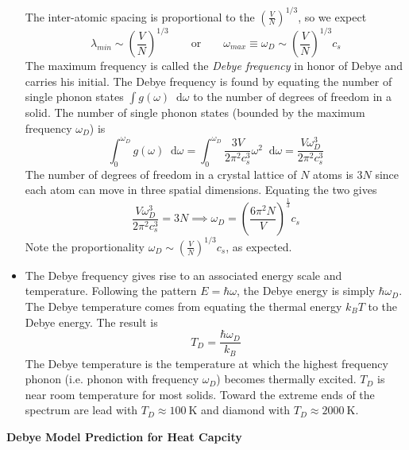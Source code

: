 \documentclass[11pt, a4paper]{article}
\newcommand{\eqtext}[1]{\qquad \text{#1} \qquad}
\newcommand{\diff}{\mathop{}\!\mathrm{d}} %
\begin{document}
\begin{itemize}
	The inter-atomic spacing is proportional to the $ \left(\frac{V}{N}\right)^{1/3} $, so we expect
	\begin{equation*}
		\lambda_{min} \sim \left(\frac{V}{N}\right)^{1/3} \eqtext{or} \omega_{max} \equiv \omega_{D} \sim \left(\frac{V}{N}\right)^{1/3} c_{s}
	\end{equation*}
	The maximum frequency is called the \textit{Debye frequency} in honor of Debye and carries his initial. The Debye frequency is found by equating the number of single phonon states $ \int g(\omega)\diff \omega $ to the number of degrees of freedom in a solid. The number of single phonon states (bounded by the maximum frequency $ \omega_{D} $) is
	\begin{equation*}
		\int_{0}^{\omega_{D}} g(\omega)\diff \omega  = \int_{0}^{\omega_{D}}\frac{3V}{2\pi^{2}c_{s}^{3}} \omega^{2} \diff \omega = \frac{V\omega_{D}^{3}}{2\pi^{2}c_{s}^{3}}
	\end{equation*}
	The number of degrees of freedom in a crystal lattice of $ N $ atoms is $ 3N $ since each atom can move in three spatial dimensions. Equating the two gives
	\begin{equation*}
		\frac{V\omega_{D}^{3}}{2\pi^{2}c_{s}^{3}} = 3N \implies \omega_{D} = \left(\frac{6\pi^{2}N}{V}\right)^{\frac{1}{3}}c_{s}
	\end{equation*}
	Note the proportionality $ \omega_{D} \sim \left(\frac{V}{N}\right)^{1/3} c_{s} $, as expected. 
	
	\item The Debye frequency gives rise to an associated energy scale and temperature. Following the pattern $ E = \hbar \omega $, the Debye energy is simply $ \hbar \omega_{D} $. The Debye temperature comes from equating the thermal energy $ k_{B}T $ to the Debye energy. The result is
	\begin{equation*}
		T_{D} = \frac{\hbar \omega_{D}}{k_{B}}
	\end{equation*}
	The Debye temperature is the temperature at which the highest frequency phonon (i.e. phonon with frequency $ \omega_{D} $) becomes thermally excited. $ T_{D} $ is near room temperature for most solids. Toward the extreme ends of the spectrum are lead with $ T_{D} \approx \SI{100}{\kelvin} $ and diamond with $ T_{D} \approx \SI{2000}{\kelvin} $. 
	
\end{itemize}
\textbf{Debye Model Prediction for Heat Capcity}
\end{document}
